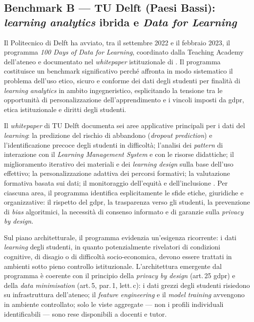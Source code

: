 \subsection{Benchmark B --- TU Delft (Paesi Bassi): \textit{learning analytics} ibrida e
\textit{Data for Learning}}

Il Politecnico di Delft ha avviato, tra il settembre 2022 e il febbraio 2023, il programma
\textit{100 Days of Data for Learning}, coordinato dalla Teaching Academy dell'ateneo e
documentato nel \textit{whitepaper} istituzionale di \textcite{Specht2023DataLearning}.
Il programma costituisce un benchmark significativo perché affronta in modo sistematico
il problema dell'uso etico, sicuro e conforme dei dati degli studenti per finalità di
\textit{learning analytics} in ambito ingegneristico, esplicitando la tensione tra le
opportunità di personalizzazione dell'apprendimento e i vincoli imposti da \gls{gdpr}, etica
istituzionale e diritti degli studenti.

Il \textit{whitepaper} di TU Delft documenta sei aree applicative principali per i dati
del \textit{learning}: la predizione del rischio di abbandono (\textit{dropout
prediction}) e l'identificazione precoce degli studenti in difficoltà; l'analisi dei
\textit{pattern} di interazione con il \textit{Learning Management System} e con le
risorse didattiche; il miglioramento iterativo dei materiali e dei \textit{learning
design} sulla base dell'uso effettivo; la personalizzazione adattiva dei percorsi
formativi; la valutazione formativa basata sui dati; il monitoraggio dell'equità e
dell'inclusione \parencite{Specht2023DataLearning}. Per ciascuna area, il programma
identifica esplicitamente le sfide etiche, giuridiche e organizzative: il
rispetto del \gls{gdpr}, la trasparenza verso gli studenti, la prevenzione di
\textit{bias} algoritmici, la necessità di consenso informato e di garanzie sulla
\textit{privacy by design}.

Sul piano architetturale, il programma evidenzia un'esigenza ricorrente: i dati
\textit{learning} degli studenti, in quanto potenzialmente rivelatori di condizioni
cognitive, di disagio o di difficoltà socio-economica, devono essere trattati in ambienti
sotto pieno controllo istituzionale. L'architettura emergente dal programma è coerente
con il principio della \textit{privacy by design} (art.\,25 \gls{gdpr}) e della
\textit{data minimisation} (art.\,5, par.\,1, lett.\,c): i dati grezzi degli studenti
risiedono su infrastruttura dell'ateneo; il \textit{feature engineering} e il
\textit{model training} avvengono in ambiente controllato; solo le viste aggregate ---
non i profili individuali identificabili --- sono rese disponibili a docenti e tutor.

